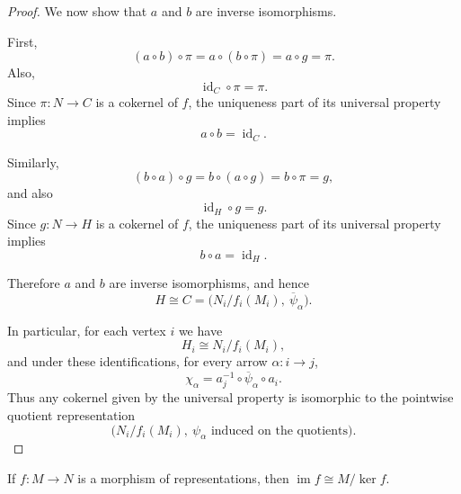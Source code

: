 \documentclass[11pt, a4paper]{report}
\begin{document}
\begin{proof}
        We now show that $a$ and $b$ are inverse isomorphisms.
        
        First,
        \[
        (a\circ b)\circ \pi
        =a\circ (b\circ \pi)
        =a\circ g
        =\pi.
        \]
        Also,
        \[
        \operatorname{id}_C\circ \pi=\pi.
        \]
        Since $\pi:N\to C$ is a cokernel of $f$, the uniqueness part of its universal property implies
        \[
        a\circ b=\operatorname{id}_C.
        \]
        
        Similarly,
        \[
        (b\circ a)\circ g
        =b\circ (a\circ g)
        =b\circ \pi
        =g,
        \]
        and also
        \[
        \operatorname{id}_H\circ g=g.
        \]
        Since $g:N\to H$ is a cokernel of $f$, the uniqueness part of its universal property implies
        \[
        b\circ a=\operatorname{id}_H.
        \]
        
        Therefore $a$ and $b$ are inverse isomorphisms, and hence
        \[
        H\cong C=\bigl(N_i/f_i(M_i),\ \overline{\psi}_\alpha\bigr).
        \]
        
        In particular, for each vertex $i$ we have
        \[
        H_i\cong N_i/f_i(M_i),
        \]
        and under these identifications, for every arrow $\alpha:i\to j$,
        \[
        \chi_\alpha
        =
        a_j^{-1}\circ \overline{\psi}_\alpha\circ a_i.
        \]
        Thus any cokernel given by the universal property is isomorphic to the pointwise quotient representation
        \[
        \bigl(N_i/f_i(M_i),\ \psi_\alpha \text{ induced on the quotients}\bigr).
        \]
        \end{proof}



\begin{theorem} 
If $ f: M\to N $ is a morphism of representations, then $ \operatorname{im}f \cong M/\operatorname{ker}f $. 
\end{theorem}
\end{document}
